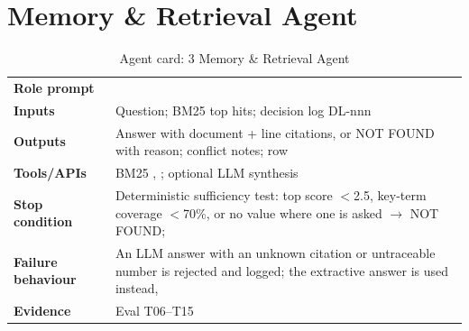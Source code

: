 \section{Memory \& Retrieval Agent}
\begin{table}[H]
\centering\footnotesize
\caption{Agent card: 3 Memory \& Retrieval Agent}
\label{tab:card-memory}
\begin{tabularx}{\textwidth}{>{\raggedright\arraybackslash}p{2.9cm}L}
\toprule
\textbf{Role prompt} &  \\
\textbf{Inputs} & Question; BM25 top hits; decision log DL-nnn \\
\textbf{Outputs} & Answer with document + line citations, or NOT FOUND with reason; conflict notes;  row \\
\textbf{Tools/APIs} & BM25 \parencite{robertson2009bm25}, ; optional LLM synthesis \\
\textbf{Stop condition} & Deterministic sufficiency test: top score $<$2.5, key-term coverage $<$70\%, or no value where one is asked $\rightarrow$ NOT FOUND;  \\
\textbf{Failure behaviour} & An LLM answer with an unknown citation or untraceable number is rejected and logged; the extractive answer is used instead,  \\
\textbf{Evidence} & Eval T06--T15 \\
\bottomrule
\end{tabularx}
\end{table}

